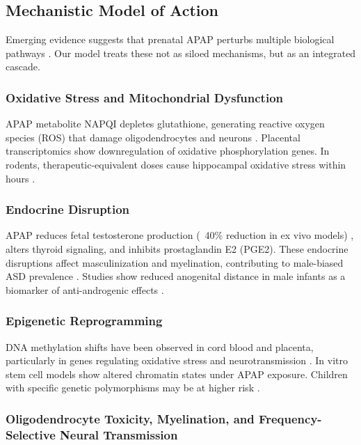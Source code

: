 \documentclass[12pt]{article}
\begin{document}
\subsection{Mechanistic Model of Action}
Emerging evidence suggests that prenatal APAP perturbs multiple biological pathways \citep{baker2020,kristensen2016,zhu2021}. Our model treats these not as siloed mechanisms, but as an integrated cascade.

\subsubsection{Oxidative Stress and Mitochondrial Dysfunction}
APAP metabolite NAPQI depletes glutathione, generating reactive oxygen species (ROS) that damage oligodendrocytes and neurons \citep{parker2020,posadas2019}. Placental transcriptomics show downregulation of oxidative phosphorylation genes. In rodents, therapeutic-equivalent doses cause hippocampal oxidative stress within hours \citep{philippot2022,riffel2020}.

\subsubsection{Endocrine Disruption}
APAP reduces fetal testosterone production (~40\% reduction in ex vivo models) \citep{kristensen2016}, alters thyroid signaling, and inhibits prostaglandin E2 (PGE2). These endocrine disruptions affect masculinization and myelination, contributing to male-biased ASD prevalence \citep{bauer2021}. Studies show reduced anogenital distance in male infants as a biomarker of anti-androgenic effects \citep{liew2016}.

\subsubsection{Epigenetic Reprogramming}  
DNA methylation shifts have been observed in cord blood and placenta, particularly in genes regulating oxidative stress and neurotransmission \citep{zhu2021}. In vitro stem cell models show altered chromatin states under APAP exposure. Children with specific genetic polymorphisms may be at higher risk \citep{schultz2008,bittker2018}.

\subsubsection{Oligodendrocyte Toxicity, Myelination, and Frequency-Selective Neural Transmission}
\end{document}
